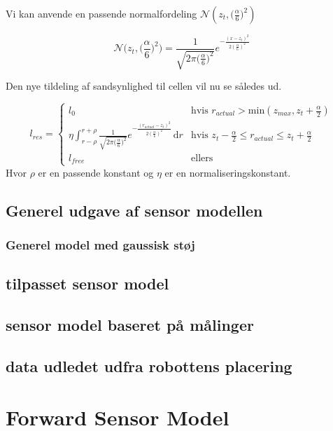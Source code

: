 Vi kan anvende en passende normalfordeling $\mathcal{N}(z_t,\big(\frac{\alpha}{6}\big)^2)$ 




$$\mathcal{N}\bigg(z_t,\bigg(\frac{\alpha}{6}\bigg)^2\bigg) = 
\frac{1}{\sqrt{2 \pi \big(\frac{\alpha}{6}\big)^2}}e^{- \frac{(x - z_t)^2}{2 (\frac{\alpha}{6})^2}}$$

Den nye tildeling af sandsynlighed til cellen vil nu se således ud.

$$l_{res} = \begin{cases} 
	l_0 &\text{hvis }r_{actual} > \text{min}(z_{max},z_t+\frac{\alpha}{2}) \\ 
	
	
	\eta \int_{r-\rho}^{r+\rho} \frac{1}{\sqrt{2 \pi \big(\frac{\alpha}{6}\big)^2}}e^{- \frac{(r_{actual} - z_t)^2}{2 (\frac{\alpha}{6})^2}}\, \mathrm{d}r
		&\text{hvis } z_t-\frac{\alpha}{2} \leq r_{actual} \leq z_t+\frac{\alpha}{2}\\ 

	l_{free} &\text{ellers}	
\end{cases}$$
Hvor $\rho$ er en passende konstant og $\eta$ er en normaliseringskonstant.








\subsection{Generel udgave af sensor modellen}


\subsubsection{Generel model med gaussisk støj}



\subsection{tilpasset sensor model}



\subsection{sensor model baseret på målinger}



\subsection{data udledet udfra robottens placering}



\section{Forward Sensor Model	}

















\
